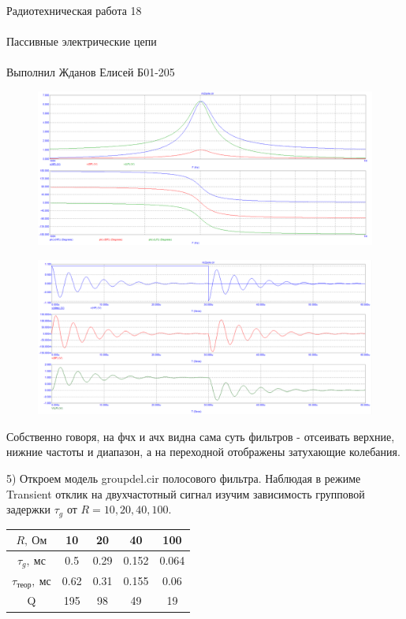 \documentclass{astroedu-lab}
\begin{document}
\begin{problem}{\huge Радиотехническая работа 18\\\\Пассивные электрические цепи\\\\Выполнил Жданов Елисей Б01-205}
\begin{figure}[!h]
	\centering
	\includegraphics[width=1\textwidth]{4_4.png}
	\label{fig:boiler}
\end{figure}

\begin{figure}[!h]
	\centering
	\includegraphics[width=1\textwidth]{4_5.png}
	\label{fig:boiler}
\end{figure}

Собственно говоря, на фчх и ачх видна сама суть фильтров - отсеивать верхние, нижние частоты и диапазон, а на переходной отображены затухающие колебания.

5) Откроем модель groupdel.cir полосового фильтра. Наблюдая в режиме Transient отклик на двухчастотный сигнал изучим зависимость групповой задержки $\tau_g$ от $R = 10, 20, 40, 100$.

\begin{center}
\begin{tabular}{|c|c|c|c|c|}
\hline 
$R, \: \text{Ом}$ & 10 & 20 & 40 & 100 \\ 
\hline 
$\tau_g, \: \text{мс}$ & 0.5 & 0.29 & 0.152 & 0.064 \\ 
\hline 
$\tau_{\textit{теор}}, \: \text{мс}$ & 0.62 & 0.31 & 0.155 & 0.06 \\ 
\hline 
Q & 195 & 98 & 49 & 19 \\ 
\hline 
\end{tabular}
\end{center}


\end{problem}
\end{document}
